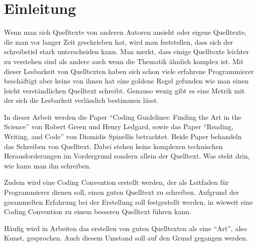 \section{Einleitung}
Wenn man sich Quelltexte von anderen Autoren ansieht oder eigene Quelltexte, die man vor langer Zeit geschrieben hat, wird man feststellen, dass sich der schreibstiel stark unterscheiden kann. Man merkt, dass einige Quelltexte leichter zu verstehen sind als andere auch wenn die Thematik ähnlich komplex ist. Mit dieser Lesbarkeit von Quelltexten haben sich schon viele erfahrene Programmierer beschäftigt\cite{Knuth, Heusser, Kamp, Martin, reed} aber keine von ihnen hat eine goldene Regel gefunden wie man einen leicht verständlichen Quelltext schreibt. Genauso wenig gibt es eine Metrik mit der sich die Lesbarkeit verlässlich bestimmen lässt.

In dieser Arbeit werden die Paper \enquote{Coding Guidelines: Finding the Art in the Science} von Robert Green und Henry Ledgard\cite{Green}, sowie das Paper \enquote{Reading, Writing, and Code} von Diomidis Spinellis\cite{Spinellis} betrachtet. Beide Paper behandeln das Schreiben von Quelltext. Dabei stehen keine komplexen technischen Herausforderungen im Vordergrund sondern allein der Quelltext. Was steht drin, wie kann man ihn schreiben.

Zudem wird eine Coding Convention erstellt werden, der als Leitfaden für Programmierer dienen soll, einen guten Quelltext zu schreiben. Aufgrund der gesammelten Erfahrung bei der Erstellung soll festgestellt werden, in wieweit eine Coding Convention zu einem besseren Quelltext führen kann.

Häufig wird in Arbeiten das erstellen von guten Quelltexten als eine \enquote{Art}, also Kunst, gesprochen. Auch diesem Umstand soll auf den Grund gegangen werden.
